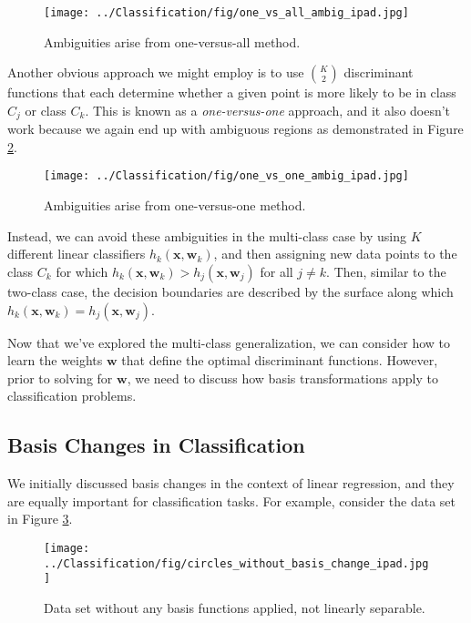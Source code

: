 \begin{figure}
    \centering
    \texttt{[image: ../Classification/fig/one\_vs\_all\_ambig\_ipad.jpg]}
    \caption{Ambiguities arise from one-versus-all method.}
    \label{fig:one-vs-all-ambig}
\end{figure}

Another obvious approach we might employ is to use $\binom{K}{2}$ discriminant functions that each determine whether a given point is more likely to be in class $C_{j}$ or class $C_{k}$. This is known as a \textit{one-versus-one} approach, and it also doesn't work because we again end up with ambiguous regions as demonstrated in Figure \ref{fig:one-vs-one-ambig}.

\begin{figure}
    \centering
    \texttt{[image: ../Classification/fig/one\_vs\_one\_ambig\_ipad.jpg]}
    \caption{Ambiguities arise from one-versus-one method.}
    \label{fig:one-vs-one-ambig}
\end{figure}

Instead, we can avoid these ambiguities in the multi-class case by using $K$ different linear classifiers $h_{k}(\textbf{x}, \textbf{w}_{k})$, and then assigning new data points to the class $C_{k}$ for which $h_{k}(\textbf{x}, \textbf{w}_{k}) > h_{j}(\textbf{x}, \textbf{w}_{j})$ for all $j \neq k$. Then, similar to the two-class case, the decision boundaries are described by the surface along which $h_{k}(\textbf{x}, \textbf{w}_{k}) = h_{j}(\textbf{x}, \textbf{w}_{j})$.

Now that we've explored the multi-class generalization, we can consider how to learn the weights $\textbf{w}$ that define the optimal discriminant functions. However, prior to solving for $\textbf{w}$, we need to discuss how basis transformations apply to classification problems.

\subsection{Basis Changes in Classification}
We initially discussed basis changes in the context of linear regression, and they are equally important for classification tasks. For example, consider the data set in Figure \ref{fig:circles-without-basis-change}.

\begin{figure}
    \centering
    \texttt{[image: ../Classification/fig/circles\_without\_basis\_change\_ipad.jpg]}
    \caption{Data set without any basis functions applied, not linearly separable.}
    \label{fig:circles-without-basis-change}
\end{figure}


